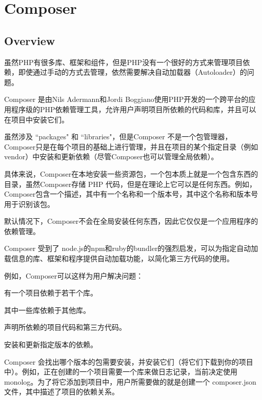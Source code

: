 \part{Composer}



\chapter{Overview}

虽然PHP有很多库、框架和组件，但是PHP没有一个很好的方式来管理项目依赖，即使通过手动的方式去管理，依然需要解决自动加载器（Autoloader）的问题。

Composer 是由Nils Adermann和Jordi Boggiano使用PHP开发的一个跨平台的应用程序级的PHP依赖管理工具，允许用户声明项目所依赖的代码和库，并且可以在项目中安装它们。

虽然涉及 ``packages" 和 ``libraries"，但是Composer 不是一个包管理器，Composer只是在每个项目的基础上进行管理，并且在项目的某个指定目录（例如 vendor）中安装和更新依赖（尽管Composer也可以管理全局依赖）。

具体来说，Composer在本地安装一些资源包，一个包本质上就是一个包含东西的目录，虽然Composer存储 PHP 代码，但是在理论上它可以是任何东西。例如，Composer包含一个描述，其中有一个名称和一个版本号，其中这个名称和版本号用于识别该包。

默认情况下，Composer不会在全局安装任何东西，因此它仅仅是一个应用程序的依赖管理。

Composer 受到了 node.js的npm和ruby的bundler的强烈启发，可以为指定自动加载信息的库、框架和程序提供自动加载功能，以简化第三方代码的使用。

例如，Composer可以这样为用户解决问题：

\begin{compactenum}
\item 有一个项目依赖于若干个库。

\item 其中一些库依赖于其他库。

\item 声明所依赖的项目代码和第三方代码。

\item 安装和更新指定版本的依赖。
\end{compactenum}

Composer 会找出哪个版本的包需要安装，并安装它们（将它们下载到你的项目中）。例如，正在创建的一个项目需要一个库来做日志记录，当前决定使用 monolog。为了将它添加到项目中，用户所需要做的就是创建一个 composer.json 文件，其中描述了项目的依赖关系。

